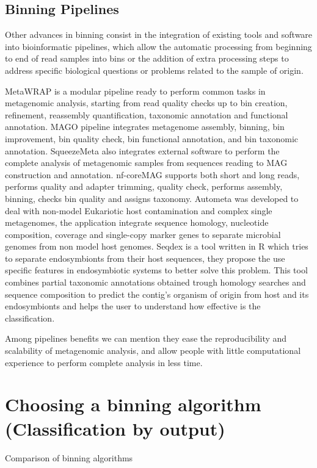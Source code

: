 \documentclass{article}
\begin{document}
\subsection{ Binning Pipelines}
Other advances in binning consist in the integration of existing tools and software into bioinformatic pipelines, which  allow the automatic processing from beginning to end of read samples into bins or the addition of extra processing steps to address specific biological questions or problems related to the sample of origin.

MetaWRAP is a modular pipeline ready to perform common tasks in metagenomic analysis, starting from read quality checks up to bin creation, refinement, reassembly quantification, taxonomic annotation and functional annotation.
MAGO pipeline integrates metagenome assembly, binning, bin improvement, bin quality check, bin functional annotation, and bin taxonomic annotation. 
SqueezeMeta also integrates external software to perform the complete analysis of metagenomic samples from sequences reading to MAG construction and annotation.%
nf-coreMAG supports both short and long reads, performs quality and adapter trimming, quality check,  performs assembly, binning, checks bin quality  and assigns taxonomy.
Autometa was developed to deal with non-model Eukariotic host contamination and complex single metagenomes, the application integrate sequence homology, nucleotide composition, coverage and single-copy marker genes to separate microbial genomes from non model host genomes. 
Seqdex is a tool written in R which tries to separate endosymbionts from their host sequences, they propose the use specific features in endosymbiotic systems to better solve this problem. This tool combines partial taxonomic annotations obtained trough homology searches and sequence composition to predict the contig's organism of origin from host and its endosymbionts and helps the user to understand how effective is the classification.

Among pipelines benefits we can mention they ease the reproducibility and scalability of metagenomic analysis, and allow people with little computational experience to perform complete analysis in less time.

\section{Choosing a binning algorithm (Classification by output)}
\begin{table}
\begin{tiny}
\centering
\caption[Comparison of binning algorithms]{Comparison of binning algorithms}
	
\label{Tbinningsoftware}
\end{tiny}
\end{table}
\end{document}
